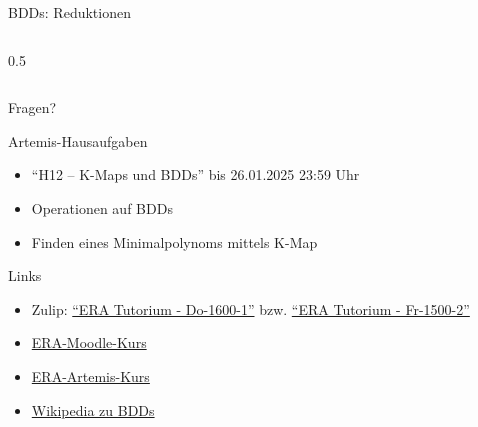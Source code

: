 \begin{frame}[c, fragile]{BDDs: Reduktionen}
\begin{columns}[c]
\begin{column}{0.5\textwidth}
\begin{center}
{
				}
			\end{center}
		\end{column}
	\end{columns}
\end{frame}


\begin{frame}[c]{}{}
	\begin{center}
		\LARGE Fragen?
	\end{center}
\end{frame}

\begin{frame}[c, fragile]{Artemis-Hausaufgaben}{}
	\begin{itemize}
		\item \enquote{H12 -- K-Maps und BDDs} bis 26.01.2025 23:59 Uhr
		\item Operationen auf BDDs
		\item Finden eines Minimalpolynoms mittels K-Map
	\end{itemize}
\end{frame}

\begin{frame}[c, fragile]{Links}{}
	\begin{itemize}
		\item Zulip: \href{https://zulip.in.tum.de/#narrow/stream/2661-ERA-Tutorium---Do-1600-1}{\enquote{ERA Tutorium - Do-1600-1}}
		      bzw. \href{https://zulip.in.tum.de/#narrow/stream/2675-ERA-Tutorium---Fr-1500-2 }{\enquote{ERA Tutorium - Fr-1500-2}}
		\item \href{https://www.moodle.tum.de/course/view.php?id=100633}{ERA-Moodle-Kurs}
		\item \href{https://artemis.in.tum.de/courses/401}{ERA-Artemis-Kurs}
		\item \href{https://en.wikipedia.org/wiki/Binary_decision_diagram}{Wikipedia zu BDDs}
	\end{itemize}
\end{frame}

\maketitle


